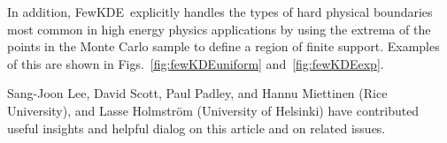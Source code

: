 \documentclass[prd,twocolumn]{revtex4}
\def\FewKDE{{\sc FewKDE}}
\begin{document}
In addition, \FewKDE\ explicitly handles the types of hard physical boundaries most common in high energy physics applications by using the extrema of the points in the Monte Carlo sample to define a region of finite support.  Examples of this are shown in Figs.~\ref{fig:fewKDEuniform} and~\ref{fig:fewKDEexp}.

\acknowledgments

Sang-Joon Lee, David Scott, Paul Padley, and Hannu Miettinen (Rice University), and Lasse Holmstr\"{o}m (University of Helsinki) have contributed useful insights and helpful dialog on this article and on related issues.



\end{document}
